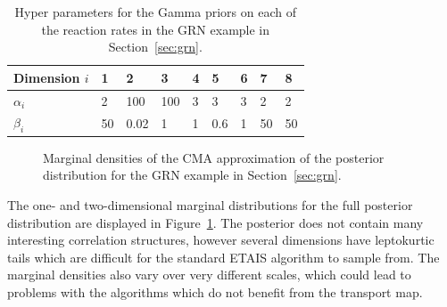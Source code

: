 \documentclass[final]{siamltex}
\begin{document}
\begin{table}[!h]
\centering
\begin{tabular}{|l|R{1.8em}|R{1.8em}|R{1.8em}|R{1.8em}|R{1.8em}|R{1.8em}|R{1.8em}|R{1.8em}|}
	\hline
	Dimension $i$ & 1 & 2& 3& 4 & 5 & 6 & 7 & 8 \\ \hline
	$\alpha_i$ & 2 & 100 & 100 & 3 & 3 & 3 & 2 & 2\\ \hline
	$\beta_i$ &50 & 0.02 & 1 & 1 & 0.6 & 1 & 50 & 50 \\ \hline
\end{tabular}
\caption{Hyper parameters for the Gamma priors on each of the reaction rates in the GRN example in Section~\ref{sec:grn}.}
\label{tab:grn_priors}
\end{table}

\begin{figure}[htb]
\centering
{}%
\caption{Marginal densities of the CMA approximation of the posterior
  distribution for the GRN example in Section~\ref{sec:grn}.}
\label{fig:GRN_posterior}
\end{figure}

The one- and two-dimensional marginal distributions for the full
posterior distribution are displayed in
Figure~\ref{fig:GRN_posterior}. The posterior does not contain many
interesting correlation structures, however several dimensions have
leptokurtic tails which are difficult for the standard ETAIS algorithm
to sample from. The marginal densities also vary over very different
scales, which could lead to problems with the algorithms which do not
benefit from the transport map.
\end{document}
